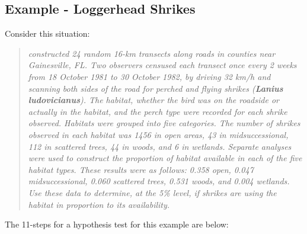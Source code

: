 \documentclass[10pt,openany]{book}\usepackage[]{graphicx}\usepackage[]{color}
\begin{document}

\subsection{Example - Loggerhead Shrikes}
\vspace{-12pt}
Consider this situation:

\begin{quote}
\textsl{\cite{BohallWood1987} constructed 24 random 16-km transects along roads in counties near Gainesville, FL.  Two observers censused each transect once every 2 weeks from 18 October 1981 to 30 October 1982, by driving 32 km/h and scanning both sides of the road for perched and flying shrikes (\textbf{Lanius ludovicianus}).  The habitat, whether the bird was on the roadside or actually in the habitat, and the perch type were recorded for each shrike observed.  Habitats were grouped into five categories.  The number of shrikes observed in each habitat was 1456 in open areas, 43 in midsuccessional, 112 in scattered trees, 44 in woods, and 6 in wetlands.  Separate analyses were used to construct the proportion of habitat available in each of the five habitat types.  These results were as follows: 0.358 open, 0.047 midsuccessional, 0.060 scattered trees, 0.531 woods, and 0.004 wetlands.  Use these data to determine, at the 5\% level, if shrikes are using the habitat in proportion to its availability.}
\end{quote}

The 11-steps  for a hypothesis test for this example are below:
\end{document}
